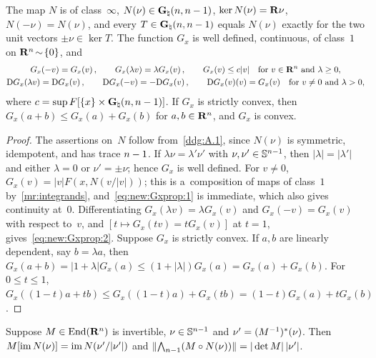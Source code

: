 \documentclass[a4paper,twoside,leqno]{article}
\newcommand{\Gh}{\pgrass{\adim}{\adim-1}}      %
\begin{document}
\begin{lemma}[new]
    \label{new:Gxprop}
    The map $N$ is of class~$\infty$, $N(\nu) \in \Gh$, $\ker N(\nu) = \mathbf{R} \nu$, $N(-\nu) = N(\nu)$,
    and every $T \in \Gh$ equals $N(\nu)$ exactly for the two unit vectors $\pm \nu \in \ker T$. The
    function $G_x$ is well defined, continuous, of class~$1$ on $\mathbf{R}^{n} \!\sim\! \{0\}$, and
    \begin{gather}
        \label{eq:new:Gxprop:1}
        G_x(-v) = G_x(v) \,, \qquad G_x(\lambda v) = \lambda G_x(v) \,, \qquad G_x(v) \le c |v|
        \quad \text{for $v \in \mathbf{R}^{n}$ and $\lambda \ge 0$}, \\
        \label{eq:new:Gxprop:2}
        \mathrm{D} G_x(\lambda v) = \mathrm{D} G_x(v) \,, \qquad \mathrm{D} G_x(-v) = - \mathrm{D} G_x(v) \,, \qquad \mathrm{D}
        G_x(v)(v) = G_x(v) \quad \text{for $v \ne 0$ and $\lambda > 0$},
    \end{gather}
    where $c = \sup F[\{x\} \times \Gh]$. If $G_x$ is strictly convex, then $G_x(a + b) \le G_x(a)
    + G_x(b)$ for $a, b \in \mathbf{R}^{n}$, and $G_x$ is convex.
\end{lemma}

\begin{proof}
    The assertions on~$N$ follow from~\ref{ddg:A.1}, since $N(\nu)$ is symmetric, idempotent, and
    has trace $n - 1$. If $\lambda \nu = \lambda' \nu'$ with $\nu, \nu' \in \mathbb{S}^{n-1}$,
    then $|\lambda| = |\lambda'|$ and either $\lambda = 0$ or $\nu' = \pm \nu$; hence $G_x$ is well
    defined. For $v \ne 0$, $G_x(v) = |v| F(x, N(v/|v|))$; this is a~composition of maps of
    class~$1$ by~\ref{mr:integrands}, and~\eqref{eq:new:Gxprop:1} is immediate, which also gives
    continuity at~$0$. Differentiating $G_x(\lambda v) = \lambda G_x(v)$ and $G_x(-v) = G_x(v)$
    with respect to~$v$, and $[ t \mapsto G_x(tv) = t G_x(v) ]$ at $t = 1$,
    gives~\eqref{eq:new:Gxprop:2}. Suppose $G_x$ is strictly convex. If $a, b$ are linearly
    dependent, say $b = \lambda a$, then $G_x(a + b) = |1 + \lambda| G_x(a) \le (1 + |\lambda|)
    G_x(a) = G_x(a) + G_x(b)$. For $0 \le t \le 1$, $G_x((1-t)a + tb) \le G_x((1-t)a) + G_x(tb) =
    (1-t) G_x(a) + t G_x(b)$.
\end{proof}

\begin{lemma}[new]
    \label{new:jacobian}
    Suppose $M \in \mathrm{End}({\mathbf{R}^{n}})$ is invertible, $\nu \in \mathbb{S}^{n-1}$ and $\nu' =
    (M^{-1})^{*}(\nu)$. Then $M[\operatorname{im} N(\nu)] = \operatorname{im} N(\nu'/|\nu'|)$ and $\|{\textstyle\boldsymbol{\bigwedge}}_{{n-1}}(M
    \circ N(\nu))\| = |\det M| \, |\nu'|$.
\end{lemma}
\end{document}
